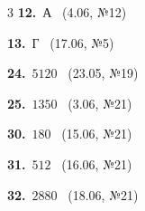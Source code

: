 \documentclass[12pt]{article}
\begin{document}
\ifshowsolutions
{}
\begin{multicols}{3}\noindent
\noindent\textbf{12.}~А \ {\scriptsize\color{gray}(4.06, №12)}\par
\noindent\textbf{13.}~Г \ {\scriptsize\color{gray}(17.06, №5)}\par
\noindent\textbf{24.}~$5120$ \ {\scriptsize\color{gray}(23.05, №19)}\par
\noindent\textbf{25.}~$1350$ \ {\scriptsize\color{gray}(3.06, №21)}\par
\noindent\textbf{30.}~$180$ \ {\scriptsize\color{gray}(15.06, №21)}\par
\noindent\textbf{31.}~$512$ \ {\scriptsize\color{gray}(16.06, №21)}\par
\noindent\textbf{32.}~$2880$ \ {\scriptsize\color{gray}(18.06, №21)}\par
\end{multicols}
\fi

\endgroup
\end{document}
